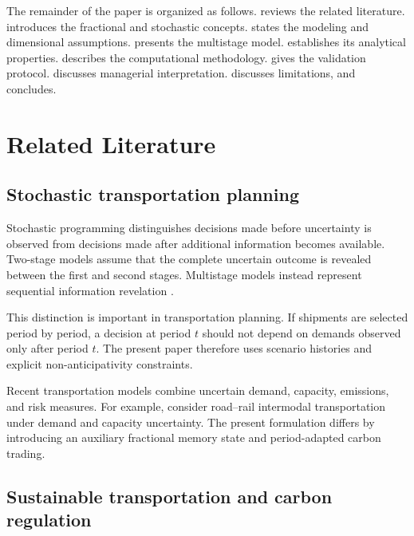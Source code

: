 \documentclass[11pt,a4paper]{article}
\begin{document}
The remainder of the paper is organized as follows.
 reviews the related literature.
 introduces the fractional and stochastic
concepts.
 states the modeling and dimensional assumptions.
 presents the multistage model.
 establishes its analytical properties.
 describes the computational methodology.
 gives the validation protocol.
 discusses managerial interpretation.
 discusses limitations, and
 concludes.

\section{Related Literature}
\label{sec:literature}

\subsection{Stochastic transportation planning}

Stochastic programming distinguishes decisions made before uncertainty
is observed from decisions made after additional information becomes
available. Two-stage models assume that the complete uncertain outcome
is revealed between the first and second stages. Multistage models
instead represent sequential information revelation
\citep{birge2011,shapiro2014}.

This distinction is important in transportation planning. If shipments
are selected period by period, a decision at period \(t\) should not
depend on demands observed only after period \(t\). The present paper
therefore uses scenario histories and explicit non-anticipativity
constraints.

Recent transportation models combine uncertain demand, capacity,
emissions, and risk measures. For example,
\citet{gbadegoye2025intermodal} consider road--rail intermodal
transportation under demand and capacity uncertainty. The present
formulation differs by introducing an auxiliary fractional memory state
and period-adapted carbon trading.

\subsection{Sustainable transportation and carbon regulation}
\end{document}
